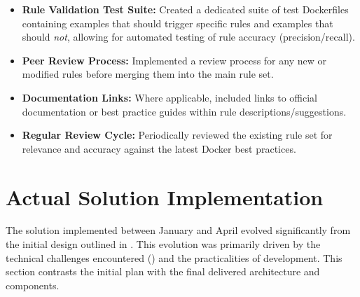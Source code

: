 \begin{itemize}
\begin{itemize}
            \item \textbf{Rule Validation Test Suite:} Created a dedicated suite of test Dockerfiles containing examples that should trigger specific rules and examples that should \textit{not}, allowing for automated testing of rule accuracy (precision/recall).
            \item \textbf{Peer Review Process:} Implemented a review process for any new or modified rules before merging them into the main rule set.
            \item \textbf{Documentation Links:} Where applicable, included links to official documentation or best practice guides within rule descriptions/suggestions.
            \item \textbf{Regular Review Cycle:} Periodically reviewed the existing rule set for relevance and accuracy against the latest Docker best practices.
        \end{itemize}
\end{itemize}
\section{Actual Solution Implementation}
\label{sec:actual_solution}

The solution implemented between January and April evolved significantly from the initial design outlined in . This evolution was primarily driven by the technical challenges encountered () and the practicalities of development. This section contrasts the initial plan with the final delivered architecture and components.

